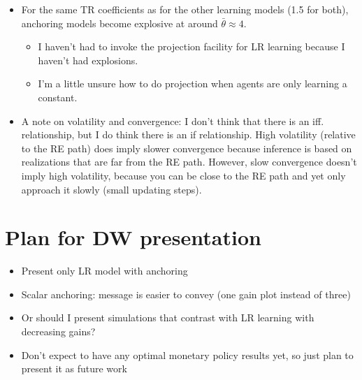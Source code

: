 \documentclass[11pt]{article}
\renewcommand{\[}{\begin{equation}}
\renewcommand{\]}{\end{equation}}
\begin{document}
\begin{itemize}
\begin{itemize}
\end{itemize}
\item For the same TR coefficients as for the other learning models (1.5 for both), anchoring models become explosive at around $\bar{\theta} \approx 4$.
\begin{itemize}
\item I haven't had to invoke the projection facility for LR learning because I haven't had explosions.
\item I'm a little unsure how to do projection when agents are only learning a constant.
\end{itemize}
\item A note on volatility and convergence: I don't think that there is an iff. relationship, but I do think there is an if relationship. High volatility (relative to the RE path) does imply slower convergence because inference is based on realizations that are far from the RE path. However, slow convergence doesn't imply high volatility, because you can be close to the RE path and yet only approach it slowly (small updating steps).
\end{itemize}

\section{Plan for DW presentation}
\begin{itemize}
\item Present only LR model with anchoring
\item Scalar anchoring: message is easier to convey (one gain plot instead of three)
\item Or should I present simulations that contrast with LR learning with decreasing gains?
\item Don't expect to have any optimal monetary policy results yet, so just plan to present it as future work
\end{itemize}
\end{document}
